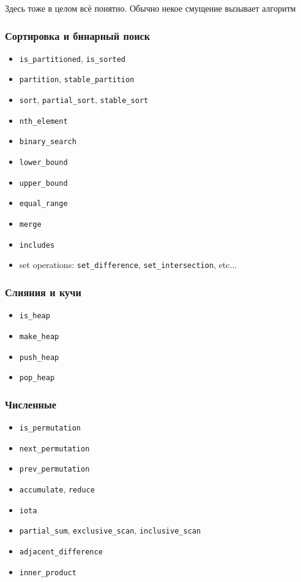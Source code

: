 \documentclass[a4paper,12pt,oneside]{book}
\begin{document}
Здесь тоже в целом всё понятно. Обычно некое смущение вызывает алгоритм 

\subsubsection{Сортировка и бинарный поиск}

\begin{itemize}
\item \lstinline!is_partitioned!, \lstinline!is_sorted!
\item \lstinline!partition!, \lstinline!stable_partition!
\item \lstinline!sort!, \lstinline!partial_sort!, \lstinline!stable_sort!
\item \lstinline!nth_element!
\item \lstinline!binary_search! 
\item \lstinline!lower_bound!
\item \lstinline!upper_bound!
\item \lstinline!equal_range!
\item \lstinline!merge!
\item \lstinline!includes!
\item set operations: \lstinline!set_difference!, \lstinline!set_intersection!, etc...
\end{itemize}

\subsubsection{Слияния и кучи}

\begin{itemize}
\item \lstinline!is_heap!
\item \lstinline!make_heap!
\item \lstinline!push_heap!
\item \lstinline!pop_heap!
\end{itemize}

\subsubsection{Численные}

\begin{itemize}
\item \lstinline!is_permutation!
\item \lstinline!next_permutation!
\item \lstinline!prev_permutation!
\item \lstinline!accumulate!, \lstinline!reduce!
\item \lstinline!iota!
\item \lstinline!partial_sum!, \lstinline!exclusive_scan!, \lstinline!inclusive_scan!
\item \lstinline!adjacent_difference!
\item \lstinline!inner_product!
\end{itemize}
\end{document}
